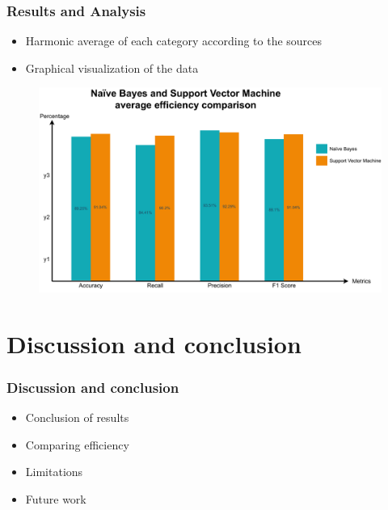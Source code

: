 \documentclass{beamer}
\begin{document}
\begin{frame}[fragile=singleslide]\frametitle{Results and Analysis}
\begin{itemize}[label = $\bullet$]
\item Harmonic average of each category according to the sources
\item Graphical visualization of the data
\end{itemize}
\begin{figure}
\centering
\includegraphics[scale=.35]{average.pdf}
\end{figure}
\end{frame}

\section{Discussion and conclusion}

\begin{frame}[fragile=singleslide]\frametitle{Discussion and conclusion}
\begin{itemize}[label=$\bullet$]
\item Conclusion of results
\item Comparing efficiency
\item Limitations
\item Future work
\end{itemize}
\end{frame}
\end{document}
